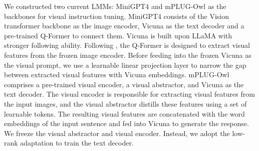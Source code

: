 
We constructed two current LMMs: MiniGPT4 \cite{zhu2023minigpt} and mPLUG-Owl \cite{ye2023mplug} as the backbones for visual instruction tuning. MiniGPT4 consists of the Vision transformer \cite{liu2023covid} backbone as the image encoder, Vicuna \cite{chiang2023vicuna} as the text decoder and a pre-trained Q-Former to connect them. Vicuna is built upon LLaMA \cite{touvron2023llama} with stronger following ability. Following \cite{zhu2023minigpt}, the Q-Former is designed to extract visual features from the frozen image encoder. Before feeding into the frozen Vicuna as the visual prompt, we use a learnable linear projection layer to narrow the gap between extracted visual features with Vicuna embeddings. mPLUG-Owl comprises a pre-trained visual encoder, a visual abstractor, and Vicuna \cite{chiang2023vicuna} as the text decoder. The visual encoder is responsible for extracting visual features from the input images, and the visual abstractor distills these features using a set of learnable tokens. The resulting visual features are concatenated with the word embeddings of the input sentence and fed into Vicuna to generate the response. We freeze the visual abstractor and visual encoder. Instead, we adopt the low-rank adaptation \cite{hu2021lora} to train the text decoder.






